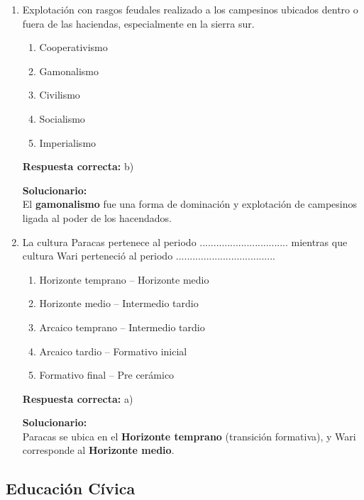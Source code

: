 \begin{enumerate}

\item  Explotación con rasgos feudales realizado a los campesinos ubicados dentro o fuera de las haciendas, especialmente en la sierra sur.
\begin{enumerate}[label=\alph*)]
	\item Cooperativismo
	\item Gamonalismo
	\item Civilismo
	\item Socialismo
	\item Imperialismo
\end{enumerate}

\textbf{Respuesta correcta:} b)

\vspace{2mm}
\textbf{Solucionario:}\\
El \textbf{gamonalismo} fue una forma de dominación y explotación de campesinos ligada al poder de los hacendados.

\item  La cultura Paracas pertenece al periodo ................................ mientras que cultura Wari perteneció al periodo ....................................
\begin{enumerate}[label=\alph*)]
	\item Horizonte temprano -- Horizonte medio
	\item Horizonte medio -- Intermedio tardio
	\item Arcaico temprano -- Intermedio tardio
	\item Arcaico tardio -- Formativo inicial
	\item Formativo final -- Pre cerámico
\end{enumerate}

\textbf{Respuesta correcta:} a)

\vspace{2mm}
\textbf{Solucionario:}\\
Paracas se ubica en el \textbf{Horizonte temprano} (transición formativa), y Wari corresponde al \textbf{Horizonte medio}.

\end{enumerate}


\subsection*{Educación Cívica}

